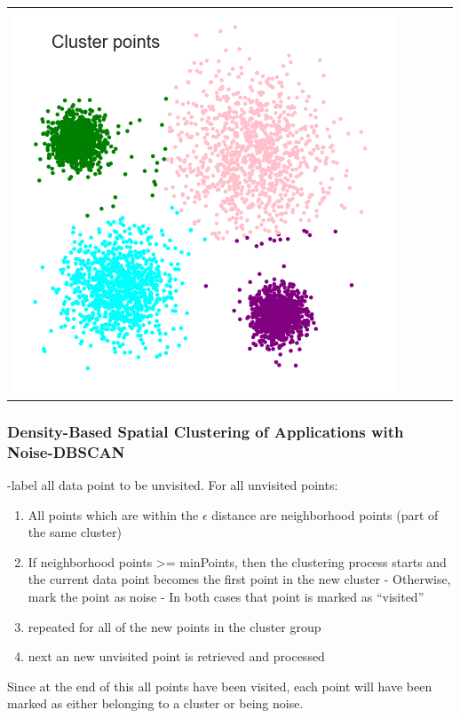 \documentclass{beamer}
\begin{document}
\begin{frame}
{\begin{tabular}{ccccc}
	\includegraphics[scale=0.15]{meanshift/meanshift-43}\\
\end{tabular}
}
\end{frame}

\begin{frame}\frametitle{Density-Based Spatial Clustering of Applications with Noise-DBSCAN}
-label all data point to be unvisited. For all unvisited points:
	\begin{enumerate}
		\item All points which are within the $\epsilon$ distance are neighborhood points (part of the same cluster)
		\item If neighborhood points >= minPoints, then the clustering process starts and the current data point becomes the first point in the new cluster
		- Otherwise, mark the point as noise
		- In both cases that point is marked as “visited”
		\item repeated for all of the new points in the cluster group
		\item next an new unvisited point is retrieved and processed
	\end{enumerate}
Since at the end of this all points have been visited, each point will have been marked as either belonging to a cluster or being noise.

\end{frame}
\end{document}
